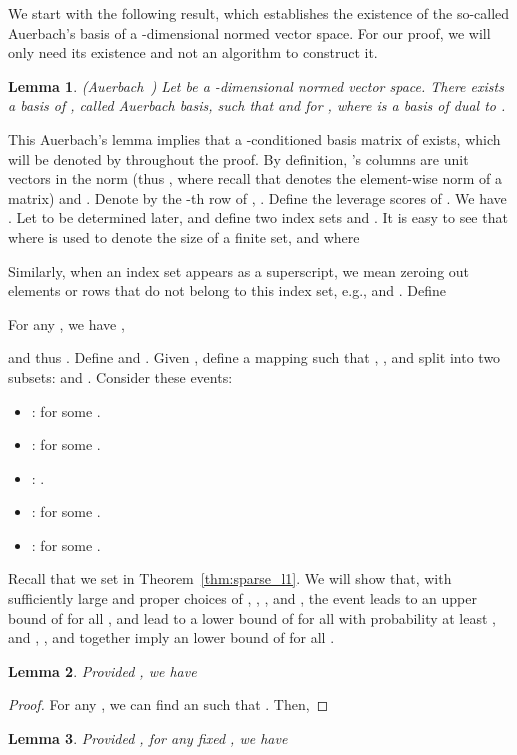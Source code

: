 \documentclass[11pt]{article}
\newtheorem{lemma}{Lemma}
\begin{document}
We start with the following result, which establishes the existence of the
so-called Auerbach's basis of a -dimensional normed vector space.
For our proof, we will only need its existence and not an algorithm to construct
it.

\begin{lemma} 
  \label{lemma:auerbach}
  (Auerbach~\cite{auerbach1930area}) Let  be a -dimensional
  normed vector space.
  There exists a basis  of , called Auerbach basis, such
  that  and  for , where
   is a basis of  dual to .
\end{lemma}

\noindent
This Auerbach's lemma implies that a -conditioned basis matrix of
 exists, which will be denoted by  throughout the proof.
By definition, 's columns are unit vectors in the  norm 
(thus , where recall that  denotes the element-wise 
 norm of a matrix) 
and .
Denote by  the -th row of , .
Define  the  leverage scores of .
We have .
Let  to be determined later, and define two index sets  and .
It is easy to see that  where  is used to
denote the size of a finite set, and  where

Similarly, when an index set appears as a superscript, we mean zeroing out
elements or rows that do not belong to this index set, e.g.,  and .
Define

For any , we have ,

and thus .
Define  and .
Given , define a mapping  such
that , , and split  into two subsets:
 and .
Consider these events:
\begin{itemize}
\item :  for some .

\item :  for some .

\item : .    

\item : 
  for some .

\item : 
  for some .
\end{itemize}
Recall that we set  in Theorem~\ref{thm:sparse_l1}. 
We will show that, with  sufficiently large and proper choices of
, , , and , the event 
leads to an upper bound of  for all ,
 and  lead to a lower bound of  for
all  with probability at least , and ,
, and  together imply an lower bound of
 for all .

\begin{lemma}
  \label{lemma:upper}
  Provided , we have
  
\end{lemma}
\begin{proof}
  For any , we can find an  such that .
  Then,
  
\end{proof}
\begin{lemma}
  \label{lemma:L_1}
  Provided , for any fixed , we have
  
\end{lemma}
\end{document}

